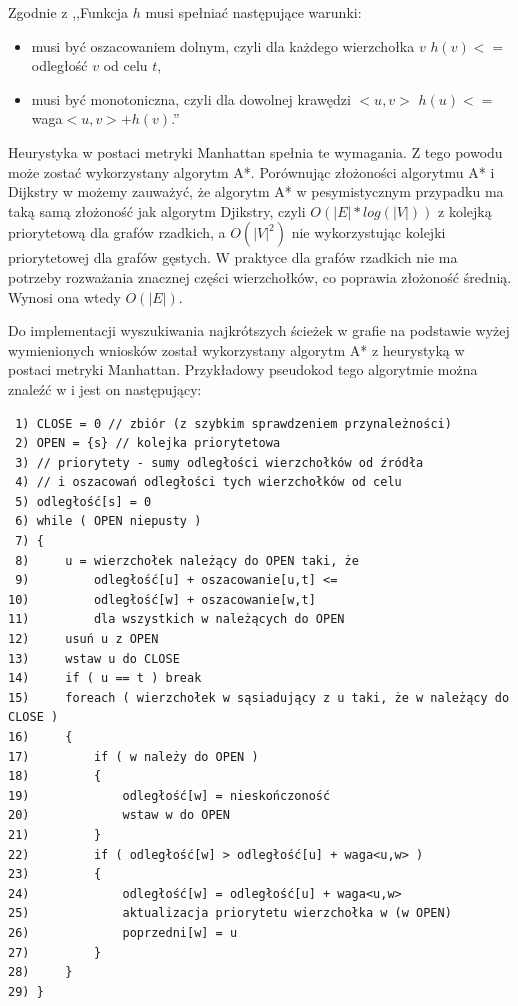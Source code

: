 \documentclass[a4paper,11pt,twoside,openright]{report}
\theoremstyle{definition}
\begin{document}
Zgodnie z \cite{AiSD2} ,,Funkcja $h$ musi spełniać następujące warunki:

\begin{itemize}[noitemsep]
\item musi być oszacowaniem dolnym, czyli dla każdego wierzchołka $v$ $h(v) <=$ odległość $v$ od celu $t$,
\item musi być monotoniczna, czyli dla dowolnej krawędzi $<u,v>$ $h(u) <= $waga$<u,v> + h(v)$.''
\end{itemize}

Heurystyka w postaci metryki Manhattan spełnia te wymagania. Z tego powodu może zostać wykorzystany algorytm A*. Porównując złożoności algorytmu A* i Dijkstry w \cite{AiSD2} możemy zauważyć, że algorytm A* w pesymistycznym przypadku ma taką samą złożoność jak algorytm Djikstry, czyli $O(|E|*log(|V|))$ z kolejką priorytetową dla grafów rzadkich, a $O(|V|^2)$ nie wykorzystując kolejki priorytetowej dla grafów gęstych. W praktyce dla grafów rzadkich nie ma potrzeby rozważania znacznej części wierzchołków, co poprawia złożoność średnią. Wynosi ona wtedy $O(|E|)$.

Do implementacji wyszukiwania najkrótszych ścieżek w grafie na podstawie wyżej wymienionych wniosków został wykorzystany algorytm A* z heurystyką w postaci metryki Manhattan. Przykładowy pseudokod tego algorytmie można znaleźć w \cite{AiSD2} i jest on następujący: %

\begin{verbatim}
 1) CLOSE = 0 // zbiór (z szybkim sprawdzeniem przynależności)
 2) OPEN = {s} // kolejka priorytetowa
 3) // priorytety - sumy odległości wierzchołków od źródła
 4) // i oszacowań odległości tych wierzchołków od celu
 5) odległość[s] = 0
 6) while ( OPEN niepusty )
 7) {
 8)     u = wierzchołek należący do OPEN taki, że
 9)         odległość[u] + oszacowanie[u,t] <=
10)         odległość[w] + oszacowanie[w,t]
11)         dla wszystkich w należących do OPEN
12)     usuń u z OPEN
13)     wstaw u do CLOSE
14)     if ( u == t ) break
15)     foreach ( wierzchołek w sąsiadujący z u taki, że w należący do CLOSE )
16)     {
17)         if ( w należy do OPEN )
18)         {
19)             odległość[w] = nieskończoność
20)             wstaw w do OPEN
21)         }
22)         if ( odległość[w] > odległość[u] + waga<u,w> )
23)         {
24)             odległość[w] = odległość[u] + waga<u,w>
25)             aktualizacja priorytetu wierzchołka w (w OPEN)
26)             poprzedni[w] = u
27)         }
28)     }
29) }
\end{verbatim}
\end{document}
